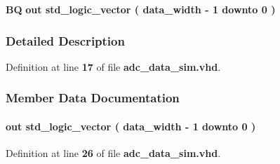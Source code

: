 \begin{DoxyCompactItemize}
\item 
{\bf BQ}  {\bfseries {\bfseries \textcolor{keywordflow}{out}\textcolor{vhdlchar}{ }}} {\bfseries \textcolor{comment}{std\+\_\+logic\+\_\+vector}\textcolor{vhdlchar}{ }\textcolor{vhdlchar}{(}\textcolor{vhdlchar}{ }\textcolor{vhdlchar}{ }\textcolor{vhdlchar}{ }\textcolor{vhdlchar}{ }{\bfseries {\bf data\+\_\+width}} \textcolor{vhdlchar}{-\/}\textcolor{vhdlchar}{ } \textcolor{vhdldigit}{1} \textcolor{vhdlchar}{ }\textcolor{keywordflow}{downto}\textcolor{vhdlchar}{ }\textcolor{vhdlchar}{ } \textcolor{vhdldigit}{0} \textcolor{vhdlchar}{ }\textcolor{vhdlchar}{)}\textcolor{vhdlchar}{ }} 
\end{DoxyCompactItemize}


\subsubsection{Detailed Description}


Definition at line {\bf 17} of file {\bf adc\+\_\+data\+\_\+sim.\+vhd}.



\subsubsection{Member Data Documentation}
\paragraph[{AI}]{ {\bfseries \textcolor{keywordflow}{out}\textcolor{vhdlchar}{ }} {\bfseries \textcolor{comment}{std\+\_\+logic\+\_\+vector}\textcolor{vhdlchar}{ }\textcolor{vhdlchar}{(}\textcolor{vhdlchar}{ }\textcolor{vhdlchar}{ }\textcolor{vhdlchar}{ }\textcolor{vhdlchar}{ }{\bfseries {\bf data\+\_\+width}} \textcolor{vhdlchar}{-\/}\textcolor{vhdlchar}{ } \textcolor{vhdldigit}{1} \textcolor{vhdlchar}{ }\textcolor{keywordflow}{downto}\textcolor{vhdlchar}{ }\textcolor{vhdlchar}{ } \textcolor{vhdldigit}{0} \textcolor{vhdlchar}{ }\textcolor{vhdlchar}{)}\textcolor{vhdlchar}{ }} \hspace{0.3cm}{\ttfamily [Port]}}\label{classadc__data__sim_aa8524f5c0472fef471ba70066b68cd0c}


Definition at line {\bf 26} of file {\bf adc\+\_\+data\+\_\+sim.\+vhd}.

